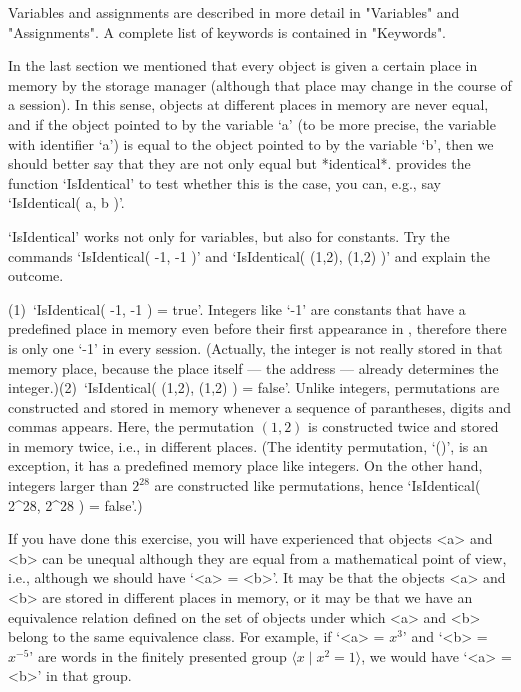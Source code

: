 Variables and assignments are described in more detail in "Variables" and
"Assignments".  A complete list of keywords is contained in "Keywords".


In the last section  we mentioned that every object   is given a  certain
place  in memory by the  {\GAP} storage manager  (although that place may
change in the course  of  a {\GAP}  session). In  this sense, objects  at
different places in memory are never equal, and if  the object pointed to
by the  variable  `a' (to be more  precise,  the variable with identifier
`a')  is  equal to the   object pointed to by  the  variable `b', then we
should better  say that they  are not only  equal but *identical*. {\GAP}
provides the function `IsIdentical' to test whether this is the case, you
can, e.g., say `IsIdentical( a, b )'.

\exercise  `IsIdentical'   works not only  for   variables,  but also for
constants. Try  the commands  `IsIdentical(  -1, -1 )'  and `IsIdentical(
(1,2), (1,2) )' and explain the outcome.

\answer  (1)~`IsIdentical( -1,  -1  )  =  true'.  Integers  like `-1' are
constants that have a predefined place in memory  even before their first
appearance  in {\GAP}, therefore there  is only one  `-1' in every {\GAP}
session.  (Actually,   the integer is  not  really stored in  that memory
place, because  the place itself --- the  address ---  already determines
the  integer.)\quad(2)~`IsIdentical(  (1,2),  (1,2) )   =  false'. Unlike
integers, permutations are constructed and   stored in memory whenever  a
sequence of    parantheses,    digits and  commas   appears.   Here,  the
permutation $(1,2)$  is constructed  twice  and stored  in  memory twice,
i.e.,  in different   places.  (The  identity  permutation,  `()', is  an
exception, it has a  predefined memory place like  integers. On the other
hand,  integers larger than  $2^{28}$  are constructed like permutations,
hence `IsIdentical( 2^28, 2^28 ) = false'.)

If  you have done this  exercise, you  will  have experienced that {\GAP}
objects  <a>  and  <b> can  be  unequal  although they are   equal from a
mathematical point of view, i.e., although we should have `<a> = <b>'. It
may  be that the objects <a>  and <b> are  stored  in different places in
memory, or it may be that we have  an equivalence relation defined on the
set of  objects under which <a>  and <b> belong   to the same equivalence
class.  For example, if `<a>  = $x^3$' and  `<b> = $x^{-5}$' are words in
the finitely presented group $\langle  x\mid x^2=1\rangle$, we would have
`<a> = <b>' in that group.

